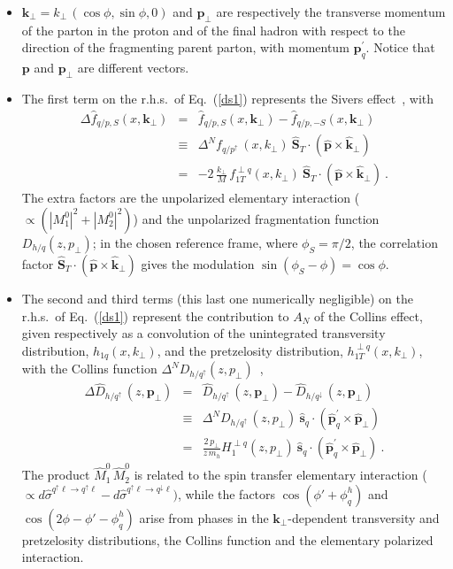 \documentclass[nofootinbib,superscriptaddress,aps]{revtex4}
\newcommand{\bea}{\begin{eqnarray}}
\newcommand{\eea}{\end{eqnarray}}
\begin{document}
\begin{itemize}
\item
$\bm{k}_\perp = k_\perp\,(\cos\phi, \sin\phi, 0)$ and $\bm{p}_\perp$ are respectively the transverse momentum of the parton in the proton and of the final hadron with respect to the direction of the fragmenting parent parton, with momentum $\bm{p}^\prime_q$. Notice that $\bm{p}$ and $\bm{p}_\perp$ are different vectors.
\item
The first term on the r.h.s.~of Eq.~(\ref{ds1}) represents the Sivers effect~\cite{Sivers:1989cc,Sivers:1990fh,Bacchetta:2004jz}, with
%
\bea
\Delta \hat f_{q/p,S}(x, \bm{k}_{\perp}) &=& \hat f_{q/p,S}(x,\bm{k}_{\perp}) - \hat f_{q/p,-S}(x, \bm{k}_{\perp})\nonumber\\
&\equiv& \Delta^N\! f_{q/p^\uparrow}\,(x, k_{\perp}) \>
\hat{\bm{S}}_T \cdot (\hat{\bm{p}} \times \hat{\bm{k}}_{\perp }) \nonumber  \\
&=& -2 \, \frac{k_\perp}{M} \, f_{1T}^{\perp q}(x, k_{\perp}) \>
\hat{\bm{S}}_T \cdot (\hat{\bm{p}} \times \hat{\bm{k}}_{\perp }) \>. \label{defsivnoi}
%
\eea
%
The extra factors are the unpolarized elementary interaction ($\propto (|M_1^0|^2 + |M_2^0|^2)$) and the unpolarized fragmentation function $D_{h/q} (z, p_{\perp})$; in the chosen reference frame, where $\phi_S=\pi/2$, the correlation factor $\hat{\bm{S}}_T \cdot (\hat{\bm{p}} \times
\hat{\bm{k}}_{\perp })$ gives the modulation $\sin(\phi_S-\phi)=\cos\phi$.
\item
The second and third terms (this last one numerically negligible) on the r.h.s.~of Eq.~(\ref{ds1}) represent the contribution to $A_N$ of the Collins effect, given respectively as a convolution of the unintegrated transversity distribution, $h_{1q}(x,k_{\perp})$, and the pretzelosity distribution, $h_{1T}^{\perp q}(x,k_{\perp})$, with the Collins function $\Delta^N\! D_{h/q^\uparrow} (z, p_{\perp})$~\cite{Collins:1992kk,Bacchetta:2004jz},
%
\bea
\Delta \hat D_{h/q^\uparrow}\,(z, \bm{p}_{\perp}) &=& \hat D_{h/q^\uparrow}\,(z, \bm{p}_{\perp}) - \hat D_{h/q^\downarrow}\,(z,\bm{p}_{\perp}) \nonumber\\
&\equiv& \Delta^N\! D_{h/q^\uparrow}\,(z, p_{\perp}) \>
\hat{\bm{s}}_q \cdot (\hat{\bm{p}}_q^\prime \times \hat{\bm{p}}_{\perp }) \nonumber \\
\label{defcolnoi} &=& \frac{2 \, p_\perp}{z \, m_h} H_{1}^{\perp q}(z,
p_{\perp}) \> \hat{\bm{s}}_q \cdot (\hat{\bm{p}}_q^\prime \times
\hat{\bm{p}}_{\perp}) \>.
%
\eea
%
The product $\hat M_1^0 \, \hat M_2^0$ is related to the spin transfer elementary interaction ($\propto d\hat\sigma^{q^\uparrow \ell \to q^\uparrow \ell} - d\hat\sigma^{q^\uparrow \ell \to q^\downarrow \ell})$, while the factors $\cos(\phi' + \phi_q^h)$ and $\cos(2\phi - \phi' - \phi_q^h)$ arise from phases in the $\bm{k}_\perp$-dependent transversity and pretzelosity distributions, the Collins function and the elementary polarized interaction.

\end{itemize}
\end{document}
